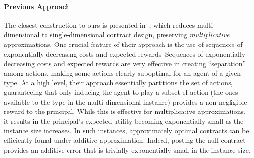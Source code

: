\paragraph{Previous Approach} The closest construction to ours is presented in~\citet{castiglioni2025reduction}, which reduces multi-dimensional to single-dimensional contract design, preserving \emph{multiplicative} approximations. 
%
One crucial feature of their approach is the use of sequences of exponentially decreasing costs and expected rewards.
%
Sequences of exponentially decreasing costs and expected rewards are very effective in creating ``separation'' among actions, making some actions clearly suboptimal for an agent of a given type.
%
At a high level, their approach essentially partitions the set of actions, guaranteeing that only inducing the agent to play a subset of action (the ones available to the type in the multi-dimensional instance) provides a non-negligible reward to the principal.
%
While this is effective for multiplicative approximations, it results in the principal’s expected utility becoming exponentially small as the instance size increases. In such instances, approximately optimal contracts can be efficiently found under additive approximation. Indeed, posting the null contract provides an additive error that is trivially exponentially small in the instance size.


